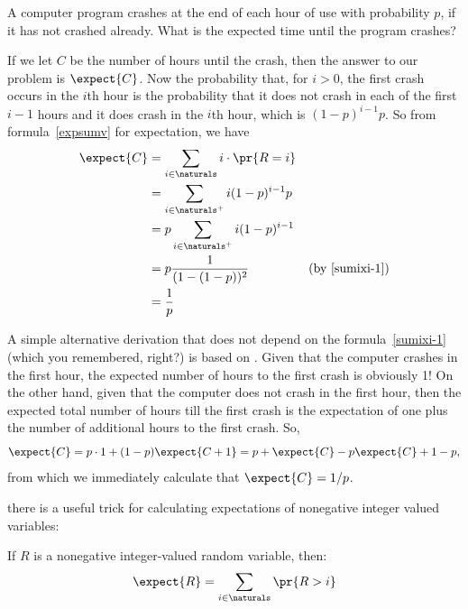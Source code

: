 A computer program crashes at the end of each hour of use with probability
$p$, if it has not crashed already.  What is the expected time until the
program crashes?

If we let $C$ be the number of hours until the crash, then the answer to
our problem is $\expect{C}$.  Now the probability that, for $i >0$, the
first crash occurs in the $i$th hour is the probability that it does not
crash in each of the first $i-1$ hours and it does crash in the $i$th
hour, which is $(1-p)^{i-1}p$.  So from formula~\eqref{expsumv} for
expectation, we have
\begin{align*}
\expect{C} & = \sum_{i \in \naturals} i \cdot \pr{R=i}\\
           & = \sum_{i \in \naturals^+} i (1-p)^{i-1}p\\
           &= p \sum_{i \in \naturals^+} i (1-p)^{i-1}\\
           &= p\frac{1}{(1-(1-p))^2} & \text{(by~\eqref{sumixi-1})}\\
           &= \frac{1}{p}
\end{align*}


A simple alternative derivation that does not depend on
the formula~\eqref{sumixi-1}
(which you remembered, right?) is based on .  Given that the computer crashes in the first hour, the
expected number of hours to the first crash is obviously 1!  On the other
hand, given that the computer does not crash in the first hour, then the
expected total number of hours till the first crash is the expectation of
one plus the number of additional hours to the first crash.  So,
\[
\expect{C} = p\cdot 1 + (1-p)\expect{C+1} = p + \expect{C} -p\expect{C} +
1 - p,
\]
from which we immediately calculate that $\expect{C} = 1/p$.

\iffalse
there is a useful trick for
calculating expectations of nonegative integer valued variables:
\begin{lemma}
If $R$ is a nonegative integer-valued random variable, then:
%
\begin{equation}\label{R>i}
\expect{R} = \sum_{i \in \naturals} \pr{R > i}
\end{equation}
\end{lemma}

